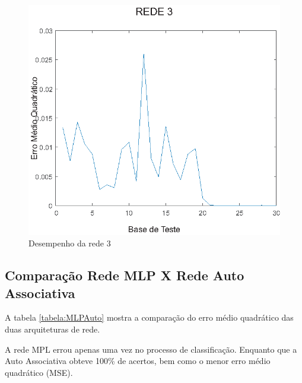 \begin{figure}[H]

\centering %
\includegraphics{04-Figuras/MSE_DesempenhoNet3}

\caption{Desempenho da rede 3}

\label{figura:rede3}

\end{figure}



\subsection{Comparação Rede MLP X Rede Auto Associativa}

A tabela \ref{tabela:MLPAuto} mostra a comparação do erro médio quadrático das duas arquiteturas de rede.


A rede MPL errou apenas uma vez no processo de classificação. Enquanto que a Auto Associativa obteve 100\% de acertos, bem como o menor erro médio quadrático (MSE).